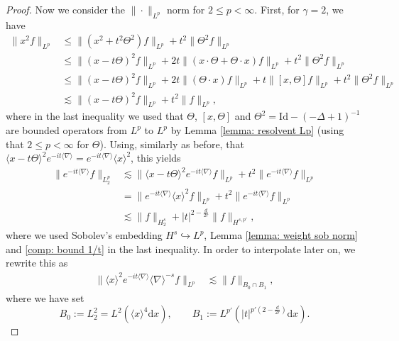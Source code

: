 \documentclass[12pt]{article}
\theoremstyle{plain}
\begin{document}
\begin{proof}
Now we consider the $\|\cdot\|_{L^p}$ norm for $2\le p<\infty$.  First, for $\gamma=2$, we have 
\begin{align*}
    \|x^2f\|_{L^p}&\le\big\|(x^2+t^2\Theta^2)f\|_{L^p}+t^2\|\Theta^2f\|_{L^p}\\
    &\le\big\|(x-t\Theta)^2f\big\|_{L^p}+2t\|(x\cdot\Theta+\Theta\cdot x)f\|_{L^p}+t^2\|\Theta^2f\|_{L^p}\\
    &\le\big\|(x-t\Theta)^2f\big\|_{L^p}+2t\|(\Theta\cdot x)f\|_{L^p}+t\|[x,\Theta]f\|_{L^p}+ t^2\|\Theta^2f\|_{L^p}\\
    &\lesssim\big\|(x-t\Theta)^2f\big\|_{L^p}+t^2\|f\|_{L^p},
\end{align*}
where in the last inequality we used that $\Theta$, $[x,\Theta]$ and $\Theta^2=\mathrm{Id}-(-\Delta+1)^{-1}$ are bounded operators from $L^p$ to $L^p$ by Lemma \ref{lemma: resolvent Lp} (using that  $2\le p<\infty$ for $\Theta$). Using, similarly as before, that $\langle x-t\Theta\rangle^2e^{-it\langle\nabla\rangle} = e^{-it\langle\nabla\rangle} \langle x\rangle^2$, this yields
\begin{align*}
        \big\| e^{-it\langle\nabla\rangle}f\big\|_{L^p_2}&\lesssim   \big\|\langle x-t\Theta \rangle^2 e^{-it\langle\nabla\rangle}f\big\|_{L^p}+t^2   \big\| e^{-it\langle\nabla\rangle}f\big\|_{L^p}\\
        &=\big\|e^{-it\langle\nabla\rangle}\langle x\rangle^2f\big\|_{L^p}+t^2\big\| e^{-it\langle\nabla\rangle}f\big\|_{L^p}\\
        &\lesssim\big\|f\big\|_{H_2^s}+|t|^{2-\frac{d}{2r}}\big\| f\big\|_{H^{s,p'}},
\end{align*}
where we used Sobolev's embedding $H^s\hookrightarrow L^p$, Lemma \ref{lemma: weight sob norm} and \eqref{comp: bound 1/t} in the last inequality. In order to interpolate later on, we rewrite this as
\begin{align}\label{eq:first_ineq_interpo}
        \big\|\langle x\rangle^2 e^{-it\langle\nabla\rangle}\langle\nabla\rangle^{-s}f\big\|_{L^p}&\lesssim \|f\|_{B_0\cap B_1},
\end{align}
where we have set
\begin{equation*}
    B_0:=L^2_2= L^2(\langle x\rangle^4\mathrm{d}x),\qquad B_1:=L^{p'}(| t|^{p'(2-\frac{d}{2r})}\mathrm{d}x).
\end{equation*}


\end{proof}
\end{document}
